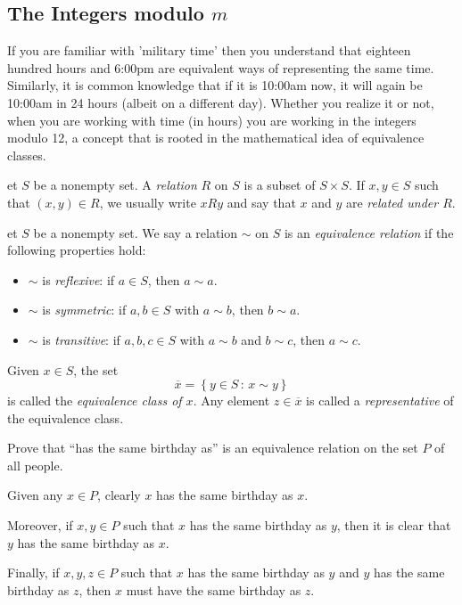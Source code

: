 \documentclass[english,course]{lecture}
\newenvironment{solution}[1][Solution]{\begin{trivlist}\pushQED{\qed}\item[\hskip \labelsep  \bfseries #1{}.\hspace{10pt}]}{\popQED\end{trivlist}}\renewcommand{\qedsymbol}{$\checkmark$}{\newenvironment{answer}{\renewcommand\qedsymbol{$\blacklozenge$}\begin{proof}[Answer]}{\end{proof}}}\newenvironment{answer}[1][Answer]{\begin{trivlist}\pushQED{\qed}\item[\hskip \labelsep  \bfseries #1{}.\hspace{10pt}]}{\popQED\end{trivlist}}\renewcommand{\qedsymbol}{$\lozenge$}
\theoremstyle{plain}
\newenvironment{definition}[1]
  {\renewcommand\theinnerdefinition{#1}\innerdefinition}
  {\endinnerdefinition}
\def\setof#1#2{{\left\{#1\,\colon\,#2\right\}}}
\def\presnotes{}
\begin{document}
\presnotes





\subsection{The Integers modulo $m$}

If you are familiar with 'military time' then you understand that eighteen hundred hours and 6:00pm are equivalent ways of representing the same time. Similarly, it is common knowledge that if it is 10:00am now, it will again be 10:00am in 24 hours (albeit on a different day). Whether you realize it or not, when you are working with time (in hours) you are working in the integers modulo 12, a concept that is rooted in the mathematical idea of equivalence classes.

\begin{definition}
	Let $S$ be a nonempty set.
	A \emph{relation} $R$ on $S$ is a subset of $S\times S$.
	If $x,y\in S$ such that $(x,y)\in R$, we usually write $xRy$ and say that $x$ and $y$ are \emph{related under $R$}.
\end{definition}



\begin{definition}
	Let $S$ be a nonempty set.
	We say a relation $\sim$ on $S$ is an \emph{equivalence relation} if the following properties hold:
	\begin{itemize}\renewcommand{\labelitemi}{$\diamond$}
		\item $\sim$ is \emph{reflexive}: if $a\in S$, then $a\sim a$.
		\item $\sim$ is \emph{symmetric}: if $a,b\in S$ with $a\sim b$, then $b\sim a$.
		\item $\sim$ is \emph{transitive}: if $a,b,c\in S$ with $a\sim b$ and $b\sim c$, then $a\sim c$.
	\end{itemize}
	Given $x\in S$, the set
	\[
		\overline{x} = \setof{y\in S}{x\sim y}
	\]
	is called the \emph{equivalence class of $x$}.
	Any element $z\in \overline{x}$ is called a \emph{representative} of the equivalence class.
\end{definition}

\begin{exer}
	Prove that ``has the same birthday as'' is an equivalence relation on the set $P$ of all people.
\end{exer}

\begin{solution}
	Given any $x\in P$, clearly $x$ has the same birthday as $x$.
	
	Moreover, if $x,y\in P$ such that $x$ has the same birthday as $y$, then it is clear that $y$ has the same birthday as $x$.
	
	Finally, if $x,y,z\in P$ such that $x$ has the same birthday as $y$ and $y$ has the same birthday as $z$, then $x$ must have the same birthday as $z$.
\end{solution}
\end{document}

